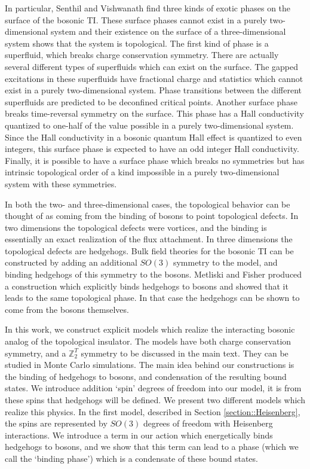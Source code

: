 \documentclass[prb,twocolumn]{revtex4-1}
\def\ztwot{\mathbb{Z}_2^T}
\begin{document}
In particular, Senthil and Vishwanath find three kinds of exotic phases on the surface of the bosonic TI. These surface phases cannot exist in a purely two-dimensional system and their existence on the surface of a three-dimensional system shows that the system is topological. The first kind of phase is a superfluid, which breaks charge conservation symmetry. There are actually several different types of superfluids which can exist on the surface. The gapped excitations in these superfluids have fractional charge and statistics which cannot exist in a purely two-dimensional system.  Phase transitions between the different superfluids are predicted to be deconfined critical points. Another surface phase breaks time-reversal symmetry on the surface. This phase has a Hall conductivity quantized to one-half of the value possible in a purely two-dimensional system. Since the Hall conductivity in a bosonic quantum Hall effect is quantized to even integers, this surface phase is expected to have an odd integer Hall conductivity. Finally, it is possible to have a surface phase which breaks no symmetries but has intrinsic topological order of a kind impossible in a purely two-dimensional system with these symmetries.

In both the two- and three-dimensional cases, the topological behavior can be thought of as coming from the binding of bosons to point topological defects. In two dimensions the topological defects were vortices, and the binding is essentially an exact realization of the flux attachment. In three dimensions the topological defects are hedgehogs.
Bulk field theories for the bosonic TI can be constructed by adding an additional $SO(3)$ symmetry to the model, and binding hedgehogs of this symmetry to the bosons.\cite{SenthilVishwanath} Metliski and Fisher produced a construction which explicitly binds hedgehogs to bosons and showed that it leads to the same topological phase. In that case the hedgehogs can be shown to come from the bosons themselves.\cite{Max} 

In this work, we construct explicit models which realize the interacting bosonic analog of the topological insulator. The models have both charge conservation symmetry, and a $\ztwot$ symmetry to be discussed in the main text. They can be studied in Monte Carlo simulations. The main idea behind our constructions is the binding of hedgehogs to bosons, and condensation of the resulting bound states. We introduce addition `spin' degrees of freedom into our model, it is from these spins that hedgehogs will be defined. We present two different models which realize this physics. In the first model, described in Section \ref{section::Heisenberg}, the spins are represented by $SO(3)$ degrees of freedom with Heisenberg interactions. We introduce a term in our action which energetically binds hedgehogs to bosons, and we show that this term can lead to a phase (which we call the `binding phase') which is a condensate of these bound states.
\end{document}
